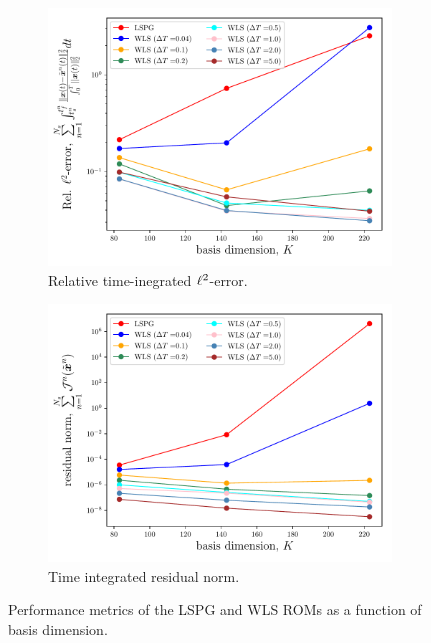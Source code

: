\begin{figure}
\begin{center}
\begin{subfigure}[t]{0.49\textwidth}
\includegraphics[trim={0cm 0cm 0cm 0cm},clip,width=1.0\linewidth]{figs/swe/swe_converge_error.pdf}
\caption{Relative time-inegrated $\ell^2$-error.}
\end{subfigure}
\begin{subfigure}[t]{0.49\textwidth}
\includegraphics[trim={0cm 0cm 0cm 0cm},clip,width=1.0\linewidth]{figs/swe/swe_converge_resid.pdf}
\caption{Time integrated residual norm.}
\end{subfigure}
\caption{Performance metrics of the LSPG and WLS ROMs as a function of basis dimension.} 
\label{fig:rom_swe_converge}
\end{center}
\end{figure}

